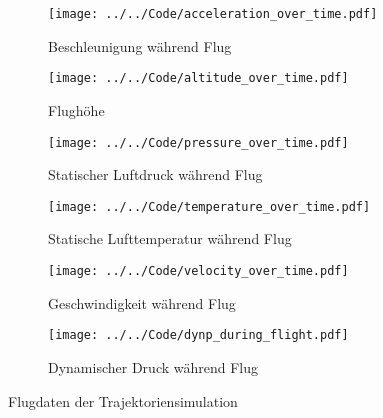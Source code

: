 \begin{figure}
    \centering

    \begin{subfigure}{0.48\textwidth}
        \centering
        \texttt{[image: ../../Code/acceleration\_over\_time.pdf]}
        \caption{Beschleunigung während Flug}
        \label{fig:acceleration_over_time}
    \end{subfigure}
    \hfill
    \begin{subfigure}{0.48\textwidth}
        \centering
        \texttt{[image: ../../Code/altitude\_over\_time.pdf]}
        \caption{Flughöhe}
        \label{fig:altitude_over_time}
    \end{subfigure}

    \vspace{1em}

    \begin{subfigure}{0.48\textwidth}
        \centering
        \texttt{[image: ../../Code/pressure\_over\_time.pdf]}
        \caption{Statischer Luftdruck während Flug}
        \label{fig:pressure_over_time}
    \end{subfigure}
    \hfill
    \begin{subfigure}{0.48\textwidth}
        \centering
        \texttt{[image: ../../Code/temperature\_over\_time.pdf]}
        \caption{Statische Lufttemperatur während Flug}
        \label{fig:temperature_over_time}
    \end{subfigure}

    \vspace{1em}

    \begin{subfigure}{0.48\textwidth}
        \centering
        \texttt{[image: ../../Code/velocity\_over\_time.pdf]}
        \caption{Geschwindigkeit während Flug}
        \label{fig:velocity_over_time}
    \end{subfigure}
    \hfill
    \begin{subfigure}{0.48\textwidth}
        \centering
        \texttt{[image: ../../Code/dynp\_during\_flight.pdf]}
        \caption{Dynamischer Druck während Flug}
        \label{fig:dynp_over_time}
    \end{subfigure}

    \caption{Flugdaten der Trajektoriensimulation}\label{fig:flugdaten_trajektoriensimulation}
\end{figure}

